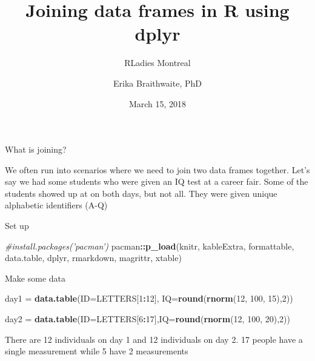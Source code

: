 \documentclass[ignorenonframetext,]{beamer}
\title{Joining data frames in R using dplyr}
\subtitle{RLadies Montreal}
\author{Erika Braithwaite, PhD}
\date{March 15, 2018}
\newenvironment{Shaded}{\begin{snugshade}}{\end{snugshade}}
\newcommand{\KeywordTok}[1]{\textcolor[rgb]{0.13,0.29,0.53}{\textbf{#1}}}
\newcommand{\DataTypeTok}[1]{\textcolor[rgb]{0.13,0.29,0.53}{#1}}
\newcommand{\DecValTok}[1]{\textcolor[rgb]{0.00,0.00,0.81}{#1}}
\newcommand{\StringTok}[1]{\textcolor[rgb]{0.31,0.60,0.02}{#1}}
\newcommand{\CommentTok}[1]{\textcolor[rgb]{0.56,0.35,0.01}{\textit{#1}}}
\newcommand{\OperatorTok}[1]{\textcolor[rgb]{0.81,0.36,0.00}{\textbf{#1}}}
\newcommand{\NormalTok}[1]{#1}
\begin{document}
\frame{\titlepage}

\begin{frame}[fragile]{What is joining?}

We often run into scenarios where we need to join two data frames
together. Let's say we had some students who were given an IQ test at a
career fair. Some of the students showed up at on both days, but not
all. They were given unique alphabetic identifiers (A-Q)

Set up

\begin{Shaded}
\begin{Highlighting}[]
\CommentTok{#install.packages('pacman')}
\NormalTok{pacman}\OperatorTok{::}\KeywordTok{p_load}\NormalTok{(knitr, kableExtra, formattable, data.table, dplyr, }
\NormalTok{               rmarkdown, magrittr, xtable)}
\end{Highlighting}
\end{Shaded}

Make some data

\begin{Shaded}
\begin{Highlighting}[]
\NormalTok{day1 =}\StringTok{  }\KeywordTok{data.table}\NormalTok{(}\DataTypeTok{ID=}\NormalTok{LETTERS[}\DecValTok{1}\OperatorTok{:}\DecValTok{12}\NormalTok{], }\DataTypeTok{IQ=}\KeywordTok{round}\NormalTok{(}\KeywordTok{rnorm}\NormalTok{(}\DecValTok{12}\NormalTok{, }\DecValTok{100}\NormalTok{, }\DecValTok{15}\NormalTok{),}\DecValTok{2}\NormalTok{))}

\NormalTok{day2 =}\StringTok{  }\KeywordTok{data.table}\NormalTok{(}\DataTypeTok{ID=}\NormalTok{LETTERS[}\DecValTok{6}\OperatorTok{:}\DecValTok{17}\NormalTok{],}\DataTypeTok{IQ=}\KeywordTok{round}\NormalTok{(}\KeywordTok{rnorm}\NormalTok{(}\DecValTok{12}\NormalTok{, }\DecValTok{100}\NormalTok{, }\DecValTok{20}\NormalTok{),}\DecValTok{2}\NormalTok{))}
\end{Highlighting}
\end{Shaded}

There are 12 individuals on day 1 and 12 individuals on day 2. 17 people
have a single measurement while 5 have 2 measurements

\end{frame}
\end{document}
